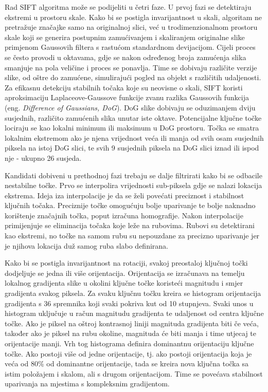 Rad SIFT algoritma može se podijeliti u četri faze. U prvoj fazi se detektiraju ekstremi u prostoru skale. Kako bi se postigla invarijantnost u skali, algoritam ne pretražuje značajke samo na originalnoj slici, već u trodimenzionalnom prostoru skale koji se generira postupnim zamućivanjem i skaliranjem originalne slike primjenom Gaussovih filtera s rastućom standardnom devijacijom. 
Cijeli proces se često provodi u oktavama, gdje se nakon određenog broja zamućenja slika smanjuje na pola veličine i proces se ponavlja. Time se dobivaju različite verzije slike, od oštre do zamućene, simulirajući pogled na objekt s različitih udaljenosti. Za efikasnu detekciju stabilnih točaka koje su neovisne o skali, SIFT koristi aproksimaciju Laplaceove-Gaussove funkcije zvanu razlika Gaussovih funkcija (eng. \textit{Difference of Gaussians, DoG}). DoG slike dobivaju se oduzimanjem dviju susjednih, različito zamućenih slika unutar iste oktave. Potencijalne ključne točke lociraju se kao lokalni minimum ili maksimum u DoG prostoru. Točka se smatra lokalnim ekstremom ako je njena vrijednost veća ili manja od svih osam susjednih piksela na istoj DoG slici, te svih 9 susjednih piksela na DoG slici iznad ili ispod nje - ukupno 26 susjeda.

Kandidati dobiveni u prethodnoj fazi trebaju se dalje filtrirati kako bi se odbacile nestabilne točke. Prvo se interpolira vrijednosti sub-piksela gdje se nalazi lokacija ekstrema. Ideja iza interpolacije je da se želi povećati preciznost i stabilnost ključnih točaka. Preciznije točke omogućuju bolje uparivanje te bolje naknadno korištenje značajnih točka, poput izračuna homografije. Nakon interpolacije primijenjuje se eliminacija točaka koje leže na rubovima. Rubovi su detektirani kao ekstremi, no točke na samom rubu su nepouzdane za precizno uparivanje jer je njihova lokacija duž samog ruba slabo definirana.

Kako bi se postigla invarijantnost na rotaciji, svakoj preostaloj ključnoj točki dodjeljuje se jedna ili više orijentacija. Orijentacija se izračunava na temelju lokalnog gradijenta slike u okolini ključne točke koristeći magnitudu i smjer gradijenta svakog piksela. Za svaku ključnu točku kreira se histogram orijentacija gradijenta s 36 spremnika koji svaki pokriva kut od 10 stupnjeva. 
Svaki unos u histogram uključuje u račun magnitudu gradijenta te udaljenost od centra ključne točke. Ako je piksel na oštroj kontrasnoj liniji magnituda gradijenta  biti če veća, također ako je piksel na rubu okoline, magnituda će biti manja i time utjecaj te orijentacije manji. Vrh tog histograma definira dominantnu orijentaciju ključne točke. Ako postoji više od jedne orijentacije, tj. ako postoji orijentacija koja je veća od 80\% od dominantne orijentacije, tada se kreira nova ključna točka sa istim položajem i skalom, ali s drugom orijentacijom. Time se povećava stabilnost uparivanja na mjestima s kompleksnim gradijentom.

